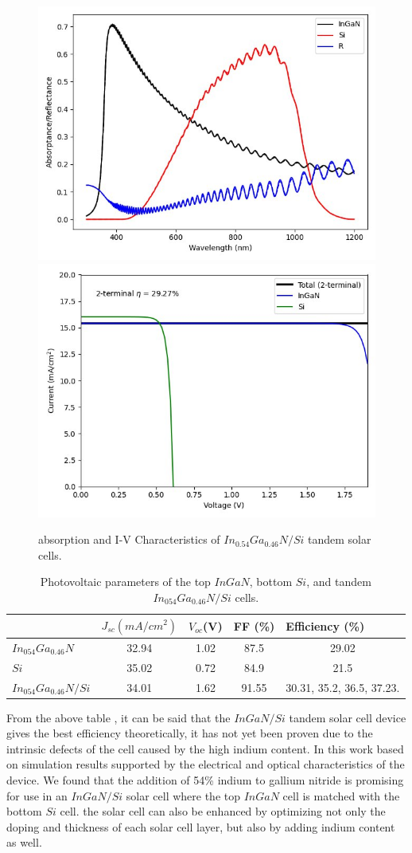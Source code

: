 \documentclass[preprint,12pt]{elsarticle}
\begin{document}
\begin{figure}[h!]
	\centering
	\includegraphics[width=0.45\linewidth, height=0.25\textheight]{Figure/Abs_Ref}
	\includegraphics[width=0.45\linewidth, height=0.25\textheight]{Figure/IV}
	\caption{absorption and I-V Characteristics of $In_{0.54}Ga_{0.46}N/Si$ tandem solar cells.}
	\label{fig:abs_iv}
\end{figure}

\begin{table}[h!]
	\begin{tabular}{@{}lcccc@{}}
		\toprule
		& \multicolumn{1}{l}{$J_{sc} (mA/cm^{2})$} & \multicolumn{1}{l}{$V_{oc}$(V)} & \multicolumn{1}{l}{FF (\%)} & 
	    \multicolumn{1}{l}{Efficiency (\%)} \\ \midrule
		$In_{054}Ga_{0.46}N$ & 32.94 & 1.02 & 87.5 & 29.02 \\
		$Si$ & 35.02 & 0.72 & 84.9 & 21.5 \\
		$In_{054}Ga_{0.46}N/Si$ & 34.01 & 1.62 & 91.55 & 30.31\cite{bib14}, 35.2\cite{bib15}, 36.5\cite{bib16}, 37.23\cite{bib17}. 
		 \\ \bottomrule
	\end{tabular}
	\caption{Photovoltaic parameters of the top $InGaN$, bottom $Si$, and tandem $In_{054}Ga_{0.46}N/Si$ cells.}
	\label{tab:result}
\end{table}

From the above table \pageref{tab:result}, it can be said that the $InGaN/Si$ tandem solar cell device gives the best efficiency theoretically, it has not yet been proven due to the intrinsic defects of the cell caused by the high indium content. In this work based on simulation results supported by the electrical and optical characteristics of the device. We found that the addition of 54\% indium to gallium nitride is promising for use in an $InGaN/Si$ solar cell where the top $InGaN$ cell is matched with the bottom $Si$ cell. the solar cell can also be enhanced by optimizing not only the doping and thickness of each solar cell layer, but also by adding indium content as well. 
\end{document}
